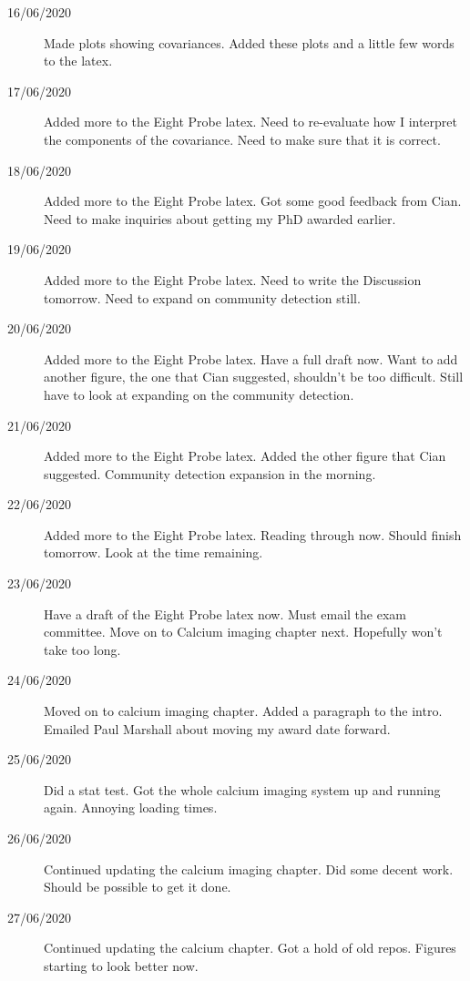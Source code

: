 \documentclass[a4paper,12pt]{article}
\theoremstyle{definition}
\begin{document}
\begin{description}
  \item[16/06/2020] Made plots showing covariances. Added these plots and a little few words to the latex.

  \item[17/06/2020] Added more to the Eight Probe latex. Need to re-evaluate how I interpret the components of the covariance. Need to make sure that it is correct.

  \item[18/06/2020] Added more to the Eight Probe latex. Got some good feedback from Cian. Need to make inquiries about getting my PhD awarded earlier.

  \item[19/06/2020] Added more to the Eight Probe latex. Need to write the Discussion tomorrow. Need to expand on community detection still.

  \item[20/06/2020] Added more to the Eight Probe latex. Have a full draft now. Want to add another figure, the one that Cian suggested, shouldn't be too difficult. Still have to look at expanding on the community detection.

  \item[21/06/2020] Added more to the Eight Probe latex. Added the other figure that Cian suggested. Community detection expansion in the morning.

  \item[22/06/2020] Added more to the Eight Probe latex. Reading through now. Should finish tomorrow. Look at the time remaining.

  \item[23/06/2020] Have a draft of the Eight Probe latex now. Must email the exam committee. Move on to Calcium imaging chapter next. Hopefully won't take too long.

  \item[24/06/2020] Moved on to calcium imaging chapter. Added a paragraph to the intro. Emailed Paul Marshall about moving my award date forward.

  \item[25/06/2020] Did a stat test. Got the whole calcium imaging system up and running again. Annoying loading times.

	\item[26/06/2020] Continued updating the calcium imaging chapter. Did some decent work. Should be possible to get it done.

	\item[27/06/2020] Continued updating the calcium chapter. Got a hold of old repos. Figures starting to look better now.


\end{description}
\end{document}
